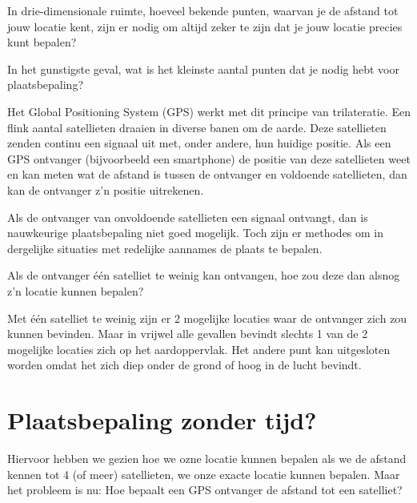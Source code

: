 \begin{opgave}
	\begin{subopgave}
		In drie-dimensionale ruimte, hoeveel bekende punten, waarvan je de afstand tot jouw locatie kent, zijn er nodig om altijd zeker te zijn dat je jouw locatie precies kunt bepalen? 
	\end{subopgave}
	\begin{subopgave}		
		In het gunstigste geval, wat is het kleinste aantal punten dat je nodig hebt voor plaatsbepaling?
	\end{subopgave}
\end{opgave}

Het Global Positioning System (GPS) werkt met dit principe van trilateratie. Een flink aantal satellieten draaien in diverse banen om de aarde. Deze satellieten zenden continu een signaal uit met, onder andere, hun huidige positie. Als een GPS ontvanger (bijvoorbeeld een smartphone) de positie van deze satellieten weet en kan meten wat de afstand is tussen de ontvanger en voldoende satellieten, dan kan de ontvanger z'n positie uitrekenen.

Als de ontvanger van onvoldoende satellieten een signaal ontvangt, dan is nauwkeurige plaatsbepaling niet goed mogelijk. Toch zijn er methodes om in dergelijke situaties met redelijke aannames de plaats te bepalen.

\begin{opgave}
	Als de ontvanger \'e\'en satelliet te weinig kan ontvangen, hoe zou deze dan alsnog z'n locatie kunnen bepalen?
	\begin{antwoord}
		Met \'e\'en satelliet te weinig zijn er 2 mogelijke locaties waar de ontvanger zich zou kunnen bevinden. Maar in vrijwel alle gevallen bevindt slechts 1 van de 2 mogelijke locaties zich op het aardoppervlak. Het andere punt kan uitgesloten worden omdat het zich diep onder de grond of hoog in de lucht bevindt.
	\end{antwoord}
\end{opgave}

\section{Plaatsbepaling zonder tijd?}

Hiervoor hebben we gezien hoe we ozne locatie kunnen bepalen als we de afstand kennen tot 4 (of meer) satellieten, we onze exacte locatie kunnen bepalen. Maar het probleem is nu: Hoe bepaalt een GPS ontvanger de afstand tot een satelliet?

